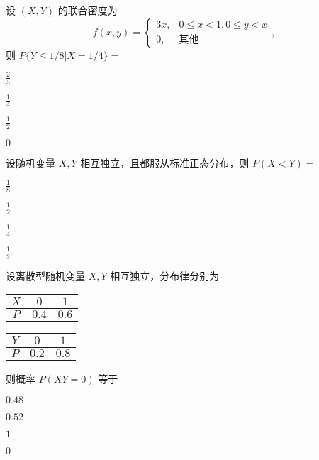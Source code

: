 \documentclass{exam-zh}
\begin{document}
\begin{question}
  设 $(X, Y)$ 的联合密度为  
  $$f(x, y) = 
  \begin{cases} 
  3x, & 0 \leq x < 1, 0 \leq y < x \\ 
  0, & \text{其他} 
  \end{cases},$$  
  则  
  $P\{Y \leq 1 / 8 | X = 1 / 4\} = $ \paren[C]
  \begin{choices}
    \item $\frac{2}{5}$  
    \item $\frac{1}{4}$  
    \item $\frac{1}{2}$  
    \item $0$  
  \end{choices}
\end{question}

\begin{question}
  设随机变量 $X, Y$ 相互独立，且都服从标准正态分布，则  
  $P(X < Y) = $ \paren[B]
  \begin{choices}
    \item $\frac{1}{8}$  
    \item $\frac{1}{2}$  
    \item $\frac{1}{4}$  
    \item $\frac{1}{3}$  
  \end{choices}
\end{question}

\begin{question}
  设离散型随机变量 $X, Y$ 相互独立，分布律分别为  

  \begin{minipage}{0.5\textwidth}
    \centering
    \begin{tabular}{|c|c|c|}
      \hline
      $X$ & $0$ & $1$ \\
      \hline
      $P$ & $0.4$ & $0.6$ \\
      \hline
    \end{tabular}
  \end{minipage}%
  \begin{minipage}{0.5\textwidth}
    \centering
    \begin{tabular}{|c|c|c|}
      \hline
      $Y$ & $0$ & $1$ \\
      \hline
      $P$ & $0.2$ & $0.8$ \\
      \hline
    \end{tabular}
  \end{minipage}

  则概率 $P(XY = 0)$ 等于 \paren[B]
  \begin{choices}
    \item $0.48$  
    \item $0.52$  
    \item $1$  
    \item $0$  
  \end{choices}
\end{question}
\end{document}
